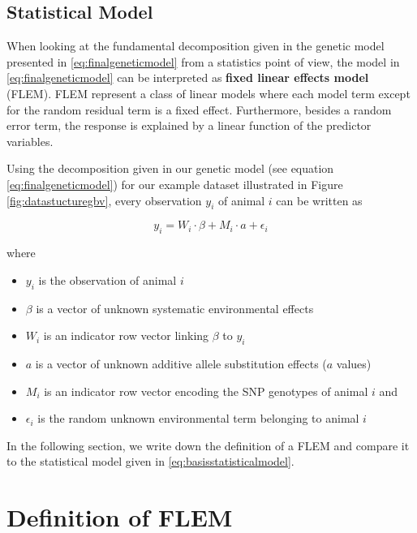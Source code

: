 \documentclass[]{book}
\providecommand{\tightlist}{%
  \setlength{\itemsep}{0pt}\setlength{\parskip}{0pt}}
\theoremstyle{definition}
\theoremstyle{definition}
\theoremstyle{definition}
\theoremstyle{remark}
\begin{document}
\hypertarget{asm-flem-statistical-model}{%
\subsection{Statistical Model}\label{asm-flem-statistical-model}}

When looking at the fundamental decomposition given in the genetic model presented in \eqref{eq:finalgeneticmodel} from a statistics point of view, the model in \eqref{eq:finalgeneticmodel} can be interpreted as \textbf{fixed linear effects model} (FLEM). FLEM represent a class of linear models where each model term except for the random residual term is a fixed effect. Furthermore, besides a random error term, the response is explained by a linear function of the predictor variables.

Using the decomposition given in our genetic model (see equation \eqref{eq:finalgeneticmodel}) for our example dataset illustrated in Figure \ref{fig:datastucturegbv}, every observation \(y_i\) of animal \(i\) can be written as

\begin{equation}
  y_i = W_i \cdot \beta + M_i \cdot a + \epsilon_i
  \label{eq:basisstatisticalmodel}
\end{equation}

where

\begin{itemize}
\tightlist
\item
  \(y_i\) is the observation of animal \(i\)
\item
  \(\beta\) is a vector of unknown systematic environmental effects
\item
  \(W_i\) is an indicator row vector linking \(\beta\) to \(y_i\)
\item
  \(a\) is a vector of unknown additive allele substitution effects (\(a\) values)
\item
  \(M_i\) is an indicator row vector encoding the SNP genotypes of animal \(i\) and
\item
  \(\epsilon_i\) is the random unknown environmental term belonging to animal \(i\)
\end{itemize}

In the following section, we write down the definition of a FLEM and compare it to the statistical model given in \eqref{eq:basisstatisticalmodel}.

\hypertarget{asm-flem-definition}{%
\section{Definition of FLEM}\label{asm-flem-definition}}
\end{document}
